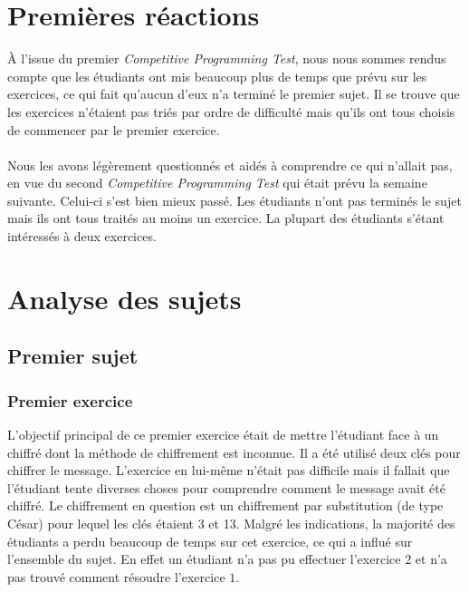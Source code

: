 \documentclass[12pt]{article}
\begin{document}
\pagebreak

\section{Premières réactions}
À l'issue du premier \textsl{Competitive Programming Test}, nous nous sommes rendus compte que les étudiants ont mis beaucoup plus de temps que prévu sur les exercices, ce qui fait qu'aucun d'eux n'a terminé le premier sujet. Il se trouve que les exercices n'étaient pas triés par ordre de difficulté mais qu'ils ont tous choisis de commencer par le premier exercice.\\\\

Nous les avons légèrement questionnés et aidés à comprendre ce qui n'allait pas, en vue du second \textsl{Competitive Programming Test} qui était prévu la semaine suivante. Celui-ci s'est bien mieux passé. Les étudiants n'ont pas terminés le sujet mais ils ont tous traités au moins un exercice. La plupart des étudiants s'étant intéressés à deux exercices.

\section{Analyse des sujets}
\subsection{Premier sujet}
\subsubsection{Premier exercice}


L'objectif principal de ce premier exercice était de mettre l'étudiant face à un chiffré dont la méthode de chiffrement est inconnue. Il a été utilisé deux clés pour chiffrer le message. L'exercice en lui-même n'était pas difficile mais il fallait que l'étudiant tente diverses choses pour comprendre comment le message avait été chiffré. Le chiffrement en question est un chiffrement par substitution (de type César) pour lequel les clés étaient \textsf{3} et \textsf{13}. Malgré les indications, la majorité des étudiants a perdu beaucoup de temps sur cet exercice, ce qui a influé sur l'ensemble du sujet. En effet un étudiant n'a pas pu effectuer l'exercice $2$ et n'a pas trouvé comment résoudre l'exercice $1$.
\end{document}
